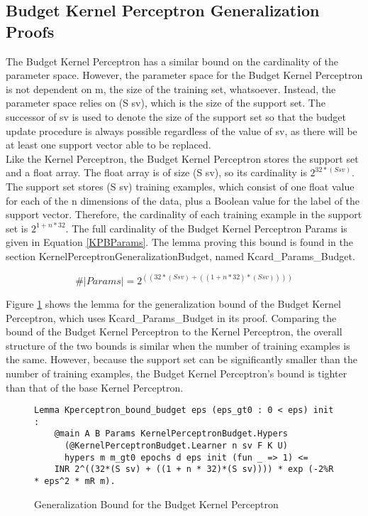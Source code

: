 \subsection{Budget Kernel Perceptron Generalization Proofs}\label{KPBProofs}
The Budget Kernel Perceptron has a similar bound on the cardinality of the parameter space. However, the parameter space for the Budget Kernel Perceptron is not dependent on m, the size of the training set, whatsoever. Instead, the parameter space relies on (S sv), which is the size of the support set. The successor of sv is used to denote the size of the support set so that the budget update procedure is always possible regardless of the value of sv, as there will be at least one support vector able to be replaced.
\\Like the Kernel Perceptron, the Budget Kernel Perceptron stores the support set and a float array. The float array is of size (S sv), so its cardinality is $2^{32 * (S sv)}$. The support set stores (S sv) training examples, which consist of one float value for each of the n dimensions of the data, plus a Boolean value for the label of the support vector. Therefore, the cardinality of each training example in the support set is $2^{1 + n * 32}$. The full cardinality of the Budget Kernel Perceptron Params is given in Equation \ref{KPBParams}. The lemma proving this bound is found in the section KernelPerceptronGeneralizationBudget, named Kcard\_Params\_Budget.

\begin{equation} \label{KPBParams}
 \#|Params| = 2^{((32*(S sv) + ((1 + n * 32)*(S sv))))}
\end{equation}

Figure \ref{KPBLemma} shows the lemma for the generalization bound of the Budget Kernel Perceptron, which uses Kcard\_Params\_Budget in its proof. Comparing the bound of the Budget Kernel Perceptron to the Kernel Perceptron, the overall structure of the two bounds is similar when the number of training examples is the same. However, because the support set can be significantly smaller than the number of training examples, the Budget Kernel Perceptron's bound is tighter than that of the base Kernel Perceptron. 

\begin{figure}
    \caption{Generalization Bound for the Budget Kernel Perceptron}
    \label{KPBLemma}
    \begin{lstlisting}
Lemma Kperceptron_bound_budget eps (eps_gt0 : 0 < eps) init : 
    @main A B Params KernelPerceptronBudget.Hypers 
      (@KernelPerceptronBudget.Learner n sv F K U)
      hypers m m_gt0 epochs d eps init (fun _ => 1) <=
    INR 2^((32*(S sv) + ((1 + n * 32)*(S sv)))) * exp (-2%R * eps^2 * mR m).
    \end{lstlisting}
\end{figure}

